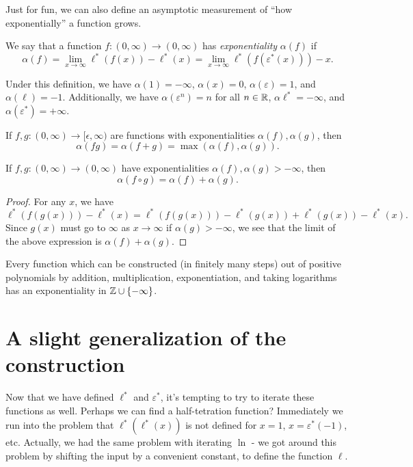 \documentclass[letterpaper,11pt]{article}
\begin{document}
Just for fun, we can also define an asymptotic measurement of ``how exponentially'' a function grows.

\begin{defn} We say that a function $f:(0,\infty) \rightarrow (0,\infty)$ has \emph{exponentiality} $\alpha(f)$ if
\[
\alpha(f) = \lim_{x\rightarrow \infty} \ell^*(f(x)) - \ell^*(x) = \lim_{x \rightarrow \infty} \ell^*(f(\varepsilon^*(x))) - x.
\]
\end{defn}

Under this definition, we have $\alpha(1) = -\infty$, $\alpha(x) = 0$, $\alpha(\varepsilon) = 1$, and $\alpha(\ell) = -1$. Additionally, we have $\alpha(\varepsilon^n) = n$ for all $n \in \mathbb{R}$, $\alpha{\ell^*} = -\infty$, and $\alpha(\varepsilon^*) = +\infty$.

\begin{prop} If $f,g : (0,\infty) \rightarrow [\epsilon,\infty)$ are functions with exponentialities $\alpha(f), \alpha(g)$, then
\[
\alpha(fg) = \alpha(f+g) = \max(\alpha(f),\alpha(g)).
\]
\end{prop}

\begin{prop} If $f,g : (0,\infty) \rightarrow (0,\infty)$ have exponentialities $\alpha(f), \alpha(g) > -\infty$, then
\[
\alpha(f \circ g) = \alpha(f) + \alpha(g).
\]
\end{prop}
\begin{proof} For any $x$, we have
\[
\ell^*(f(g(x))) - \ell^*(x) = \ell^*(f(g(x))) - \ell^*(g(x)) + \ell^*(g(x)) - \ell^*(x).
\]
Since $g(x)$ must go to $\infty$ as $x \rightarrow \infty$ if $\alpha(g) > -\infty$, we see that the limit of the above expression is $\alpha(f) + \alpha(g)$.
\end{proof}

\begin{cor} Every function which can be constructed (in finitely many steps) out of positive polynomials by addition, multiplication, exponentiation, and taking logarithms has an exponentiality in $\mathbb{Z} \cup \{-\infty\}$.
\end{cor}

\section{A slight generalization of the construction}

Now that we have defined $\ell^*$ and $\varepsilon^*$, it's tempting to try to iterate these functions as well. Perhaps we can find a half-tetration function? Immediately we run into the problem that $\ell^*(\ell^*(x))$ is not defined for $x = 1$, $x = \varepsilon^*(-1)$, etc. Actually, we had the same problem with iterating $\ln$ - we got around this problem by shifting the input by a convenient constant, to define the function $\ell$.
\end{document}
